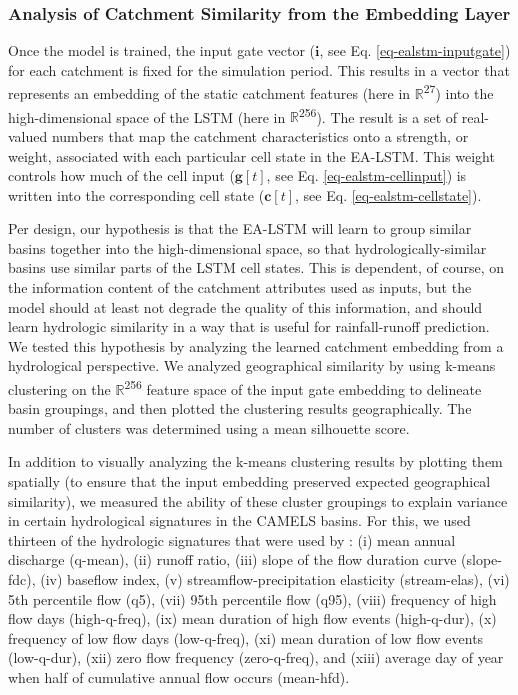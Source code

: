 \subsubsection{Analysis of Catchment Similarity from the Embedding Layer}\label{sec-methods-embedding}

Once the model is trained, the input gate vector ($\bm{i}$, see Eq. \ref{eq-ealstm-inputgate}) for each catchment is fixed for the simulation period. This results in a vector that represents an embedding of the static catchment features (here in $\mathbb{R}$\textsuperscript{27}) into the high-dimensional space of the \gls{LSTM} (here in $\mathbb{R}$\textsuperscript{256}). 
The result is a set of real-valued numbers that map the catchment characteristics onto a strength, or weight, associated with each particular cell state in the \gls{EA-LSTM}. This weight controls how much of the cell input ($\bm{g}[t]$, see Eq. \ref{eq-ealstm-cellinput}) is written into the corresponding cell state ($\bm{c}[t]$, see Eq. \ref{eq-ealstm-cellstate}).

Per design, our hypothesis is that the \gls{EA-LSTM} will learn to group similar basins together into the high-dimensional space, so that hydrologically-similar basins use similar parts of the \gls{LSTM} cell states. This is dependent, of course, on the information content of the catchment attributes used as inputs, but the model should at least not degrade the quality of this information, and should learn hydrologic similarity in a way that is useful for rainfall-runoff prediction. We tested this hypothesis by analyzing the learned catchment embedding from a hydrological perspective. We analyzed geographical similarity by using k-means clustering on the $\mathbb{R}$\textsuperscript{256} feature space of the input gate embedding to delineate basin groupings, and then plotted the clustering results geographically. The number of clusters was determined using a mean silhouette score.

In addition to visually analyzing the k-means clustering results by plotting them spatially (to ensure that the input embedding preserved expected geographical similarity), we measured the ability of these cluster groupings to explain variance in certain hydrological signatures in the \gls{CAMELS} basins. For this, we used thirteen of the hydrologic signatures that were used by \citet{addor2018selection}: (i) mean annual discharge (q-mean), (ii) runoff ratio, (iii) slope of the flow duration curve (slope-fdc), (iv) baseflow index, (v) streamflow-precipitation elasticity (stream-elas), (vi) 5th percentile flow (q5), (vii) 95th percentile flow (q95), (viii) frequency of high flow days (high-q-freq), (ix) mean duration of high flow events (high-q-dur), (x) frequency of low flow days (low-q-freq), (xi) mean duration of low flow events (low-q-dur), (xii) zero flow frequency (zero-q-freq), and (xiii) average day of year when half of cumulative annual flow occurs (mean-hfd).

